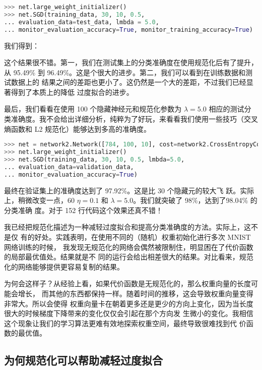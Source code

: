 \begin{lstlisting}[language=Python]
>>> net.large_weight_initializer()
>>> net.SGD(training_data, 30, 10, 0.5,
... evaluation_data=test_data, lmbda = 5.0,
... monitor_evaluation_accuracy=True, monitor_training_accuracy=True)
\end{lstlisting}

我们得到：

这个结果很不错。第一，我们在测试集上的分类准确度在使用规范化后有了提升，从
95.49\% 到 96.49\%。这是个很大的进步。第二，我们可以看到在训练数据和测试数据上的
结果之间的差距也更小了。这仍然是一个大的差距，不过我们已经显著得到了本质上的降低
过度拟合的进步。

最后，我们看看在使用 100 个隐藏神经元和规范化参数为 $\lambda = 5.0$ 相应的测试分
类准确度。我不会给出详细分析，纯粹为了好玩，来看看我们使用一些技巧（交叉熵函数和
  L2 规范化）能够达到多高的准确度。

\begin{lstlisting}[language=Python]
>>> net = network2.Network([784, 100, 10], cost=network2.CrossEntropyCost)
>>> net.large_weight_initializer()
>>> net.SGD(training_data, 30, 10, 0.5, lmbda=5.0,
... evaluation_data=validation_data,
... monitor_evaluation_accuracy=True)
\end{lstlisting}

最终在验证集上的准确度达到了 97.92\%。这是比 30 个隐藏元的较大飞
跃。\label{chap3_98_04_percent}实际上，稍微改变一点，60 \epochs{}
$\eta=0.1$ 和 $\lambda = 5.0$。我们就突破了 98\%，达到了98.04\% 的分类准确
度\label{98percent}。对于 152 行代码这个效果还真不错！

我已经把规范化描述为一种减轻过度拟合和提高分类准确度的方法。实际上，这不是仅
有的好处。实践表明，在使用不同的（随机）权重初始化进行多次 MNIST 网络训练的时候，
我发现无规范化的网络会偶然被限制住，明显困在了代价函数的局部最优值处。结果就是不
同的运行会给出相差很大的结果。对比看来，规范化的网络能够提供更容易复制的结果。

为何会这样子？从经验上看，如果代价函数是无规范化的，那么权重向量的长度可能会增长，
而其他的东西都保持一样。随着时间的推移，这会导致权重向量变得非常大。所以会使得
权重向量卡在朝着更多还是更少的方向上变化，因为当长度很大的时候梯度下降带来的变化仅仅会引起在那个方向发
生微小的变化。我相信这个现象让我们的学习算法更难有效地探索权重空间，最终导致很难找到代
价函数的最优值。

\subsection{为何规范化可以帮助减轻过度拟合}

